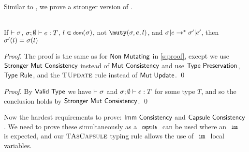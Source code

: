 Similar to , we prove a stronger version of .

\SS\begin{Corollary}\ \\
	\indent If $\vdash\sigma$, $\tyr eT$, $l\in\dom(\s)$, not $\muty(\s,e,l)$,
	and $\sigma|e\rightarrow^*\sigma'|e'$, then $\sigma'(l) = \sigma(l)$
\end{Corollary}
\SS\begin{proof}
	The proof is the same as for $\textsf{Non Mutating}$ in \autoref{s:proof},
	except we use $\textsf{Stronger Mut Consistency}$ instead of $\textsf{Mut Consistency}$
	and use $\textsf{Type Preservation}$, $\textsf{Type Rule}$, and the
	$\textsc{TUpdate}$ rule instead of $\textsf{Mut Update}$.
\qed\end{proof}

\setcounter{requirement}{2}
\SS\REQMutCons
\SS\begin{proof}
	By $\textsf{Valid Type}$ we have $\vdash\sigma$ and $\tyr eT$ for some
	type $T$, and so the conclusion holds by $\textsf{Stronger Mut Consistency}$.
\qed\end{proof}

\LS

Now the hardest requirements to prove: $\textsf{Imm Consistency}$ and $\textsf{Capsule Consistency}$.
We need to prove these simultaneously as a $\Kw{capsule}$ can be used where an $\Kw{imm}$ is expected, and our $\textsc{TAsCapsule}$ typing rule allows the use of $\Kw{imm}$ local variables.

